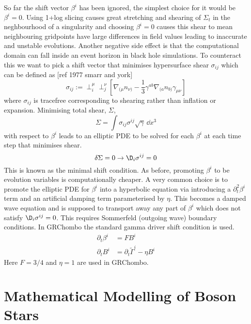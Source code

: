So far the shift vector $\beta^i$ has been ignored, the simplest choice for it would be $\beta^i=0$. Using 1+log slicing causes great stretching and shearing of $\Sigma_t$ in the neghbourhood of a singularity and choosing $\beta^i=0$ causes this shear to mean neighbouring gridpoints have large differences in field values leading to inaccurate and unstable evolutions. Another negative side effect is that the computational domain can fall inside an event horizon in black hole simulations. To counteract this we want to pick a shift vector that minimises hypersurface shear $\sigma_{ij}$ which can be defined as [ref 1977 smarr and york]
\[ \sigma_{ij}:= \perp^\mu_i \perp^\nu_j \left[\nabla_{(\mu} n_{\nu)}-\frac{1}{3}\gamma^{ab}\nabla_{(a} n_{b)} \gamma_{\mu\nu}\right] \]
where $\sigma_{ij}$ is tracefree corresponding to shearing rather than inflation or expansion. Minimising total shear, $\Sigma$,
\[ \Sigma = \int \sigma_{ij}\sigma^{ij}\sqrt{\gamma}\,\dd x^3\]
with respect to $\beta^i$ leads to an elliptic PDE to be solved for each $\beta^i$ at each time step that minimises shear. 
\[ \delta \Sigma = 0 \rightarrow \D_i\sigma^{ij}=0\]
This is known as the minimal shift condition. As before, promoting $\beta^i$ to be evolution variables is computationally cheaper. A very common choice is to promote the elliptic PDE for $\beta^i$ into a hyperbolic equation via introducing a $\partial_t^2\beta^i$ term and an artificial damping term parameterised by $\eta$. This becomes a damped wave equation and is supposed to transport away any part of $\beta^i$ which does not satisfy $\D_i \sigma^{ij}=0$. This requires Sommerfeld (outgoing wave) boundary conditions. In GRChombo the standard gamma driver shift condition is used.
\begin{align} \partial_t \beta^i &= FB^i\\
 \partial_t B^i &= \partial_t \tilde{\Gamma}^i - \eta B^i\end{align}
Here $F=3/4$ and $\eta=1$ are used in GRChombo.


\section{Mathematical Modelling of Boson Stars}
